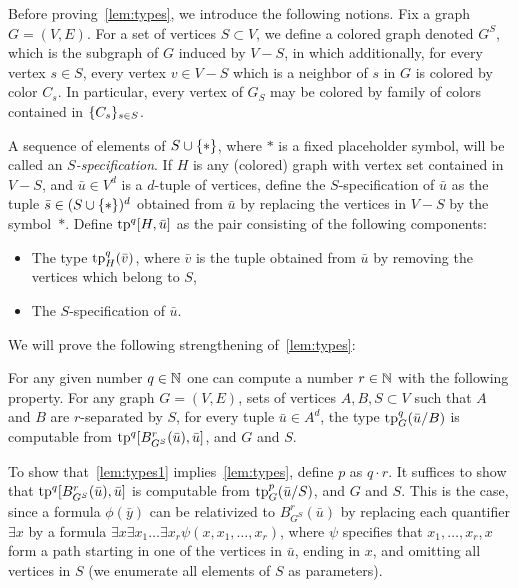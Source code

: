 Before proving~\cref{lem:types}, we introduce the following notions.
Fix a graph $G=(V,E)$.
For a set of vertices $S\subset V$,
we define a colored graph denoted $G^S$, which is 
the subgraph of $G$ induced by $V-S$,
in which additionally, for every vertex $s\in S$, every vertex $v\in V-S$ which is a neighbor of  $s$ in $G$ is colored by color $C_s$. In particular, every vertex of $G_S$
may be colored by family of colors contained in $\{C_s\}_{s\in S}$.

A sequence of elements of $S\cup\{\ast\}$,
where $\ast$ is a fixed placeholder symbol,
will be called an \emph{$S$-specification}.
If $H$ is any (colored) graph with vertex set contained in $V-S$,
and $\bar u\in V^d$ is a $d$-tuple of vertices,
define the {$S$-specification} of $\bar u$
as the tuple $\bar s\in (S\cup\{\ast\})^d$ obtained from $\bar u$ by replacing the vertices in $V-S$ by the symbol~$\ast$.
 Define $\mathrm{tp}^q[H,\bar u]$ as the
pair consisting of the following components:
\begin{itemize}
	\item The type $\mathrm{tp}^q_H(\bar v)$,
	where $\bar v$ is the tuple obtained from $\bar u$
	by removing the vertices which belong to $S$,
	\item The $S$-specification of $\bar u$.
\end{itemize}

We will prove the following strengthening of~\cref{lem:types}:

\begin{lemma}%
  \label{lem:types1}
For any given number $q\in\mathbb{N}$ one can compute 
 a number $r\in\mathbb{N}$ with the following property.
	For any graph $G=(V,E)$, sets of vertices $A,B,S\subset V$	
	such that $A$  and $B$ are $r$-separated by $S$,
	for every tuple $\bar u\in A^{d}$, 
	the type $\mathrm{tp}^q_G(\bar u/B)$
	is computable from  $\mathrm{tp}^{q}[B^r_{G^S}(\bar u), \bar u]$, and $G$ and $S$.  
\end{lemma}

To show that~\cref{lem:types1} implies~\cref{lem:types}, define $p$ as $q\cdot r$. It suffices to show that
$\mathrm{tp}^{q}[B^r_{G^S}(\bar u), \bar u]$ is computable from $\mathrm{tp}_G^p(\bar u/S)$, and $G$ and $S$. This is the case, since
a formula $\phi(\bar y)$
can be relativized to $B^r_{G^S}(\bar u)$
by replacing each quantifier $\exists x$ by a formula
$\exists x\exists x_1\ldots\exists x_r\psi (x,x_1,\ldots,x_r)$,
where $\psi$ specifies that $x_1,\ldots,x_r,x$ form a path
starting in one of the vertices in $\bar u$, ending in $x$,
and omitting all vertices in $S$ (we enumerate all elements of $S$ as parameters).

